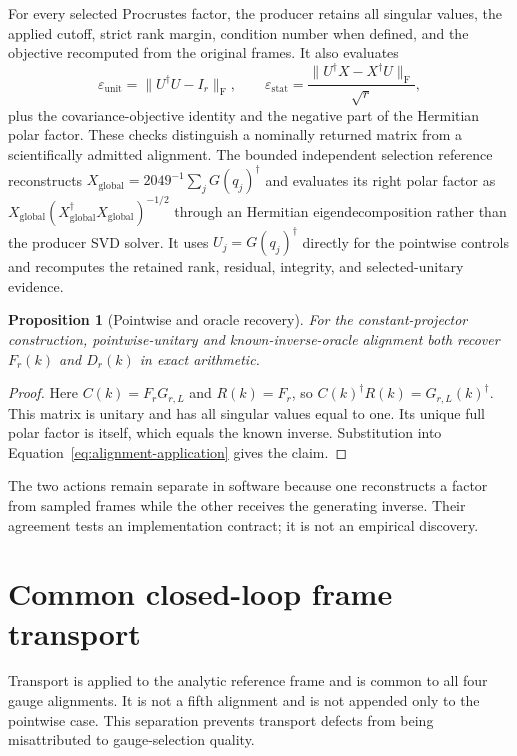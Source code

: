 \documentclass[11pt]{article}
\newtheorem{proposition}{Proposition}
\newcommand{\Frob}{\mathrm F}
\begin{document}
For every selected Procrustes factor, the producer retains all singular values, the
applied cutoff, strict rank margin, condition number when defined, and the objective
recomputed from the original frames. It also evaluates
\begin{equation}
 \varepsilon_{\mathrm{unit}}=\|U^\dagger U-I_r\|_\Frob,
 \qquad
 \varepsilon_{\mathrm{stat}}
 =\frac{\|U^\dagger X-X^\dagger U\|_\Frob}{\sqrt r},
\end{equation}
plus the covariance-objective identity and the negative part of the Hermitian polar
factor. These checks distinguish a nominally returned matrix from a scientifically
admitted alignment. The bounded independent selection reference reconstructs
$X_{\mathrm{global}}=2049^{-1}\sum_jG(q_j)^\dagger$ and evaluates its right polar factor
as $X_{\mathrm{global}}(X_{\mathrm{global}}^\dagger
X_{\mathrm{global}})^{-1/2}$ through an Hermitian eigendecomposition rather than the
producer SVD solver. It uses $U_j=G(q_j)^\dagger$ directly for the pointwise controls and
recomputes the retained rank, residual, integrity, and selected-unitary evidence.

\begin{proposition}[Pointwise and oracle recovery]
For the constant-projector construction, pointwise-unitary and known-inverse-oracle alignment both
recover $F_r(k)$ and $D_r(k)$ in exact arithmetic.
\end{proposition}

\begin{proof}
Here $C(k)=F_rG_{r,L}$ and $R(k)=F_r$, so
$C(k)^\dagger R(k)=G_{r,L}(k)^\dagger$. This matrix is unitary and has all singular
values equal to one. Its unique full polar factor is itself, which equals the known
inverse. Substitution into Equation~\eqref{eq:alignment-application} gives the claim.
\end{proof}

The two actions remain separate in software because one reconstructs a factor from
sampled frames while the other receives the generating inverse. Their agreement tests an
implementation contract; it is not an empirical discovery.

\section{Common closed-loop frame transport}
\label{sec:transport}

Transport is applied to the analytic reference frame and is common to all four gauge
alignments. It is not a fifth alignment and is not appended only to the pointwise case.
This separation prevents transport defects from being misattributed to gauge-selection
quality.
\end{document}
